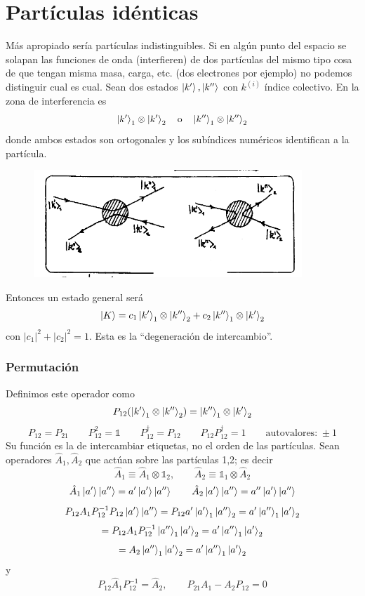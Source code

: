 \documentclass[10pt,oneside]{CBFT_book}
\begin{document}
\chapter{Partículas idénticas}

Más apropiado sería partículas indistinguibles. Si en algún punto del espacio se solapan las funciones de 
onda (interfieren) de dos partículas del mismo tipo cosa de que tengan misma masa, carga, etc. (dos 
electrones por ejemplo) no podemos distinguir cual es cual. Sean dos estados $\Ket{k'},\Ket{k''}$ con $k^{(i)}$ 
índice colectivo. En la zona de interferencia es 
\[
	\Ket{k'}_1 \otimes \Ket{k'}_2 \quad \text{o} \quad \Ket{k''}_1 \otimes \Ket{k''}_2
\]
donde ambos estados son ortogonales y los subíndices numéricos identifican a la partícula. 

\begin{figure}[htb]
	\begin{center}
	\includegraphics[width=0.9\textwidth]{images/teo2_29.pdf}
	\end{center}
	\caption{}
\end{figure} 
Entonces un estado general será
\[
	\Ket{K} = c_1 \Ket{k'}_1 \otimes \Ket{k''}_2 + c_2 \Ket{k''}_1 \otimes \Ket{k'}_2
\]
con $|c_1|^2 +|c_2|^2= 1$. 
Esta es la ``degeneración de intercambio''.

\subsection{Permutación}

Definimos este operador como 
\[
	P_{12}( \Ket{k'}_1\otimes \Ket{k''}_2 ) = \Ket{k''}_1\otimes \Ket{k'}_2
\]
\[
	P_{12} = P_{21} \qquad P_{12}^2 = \mathbb{1} \qquad P_{12}^\dagger = P_{12} \qquad 
	P_{12}P_{12}^\dagger = 1 \qquad \text{autovalores:} \; \pm 1
\]
Su función es la de intercambiar etiquetas, no el orden de las partículas.
Sean operadores $\hat{A}_1,\hat{A}_2$ que actúan sobre las partículas 1,2; es decir 
\[
	\hat{A}_1 \equiv \hat{A}_1\otimes\mathbb{1}_2, \qquad 
	\hat{A}_2 \equiv \mathbb{1}_1\otimes\hat{A}_2
\]
\[
	\hat{A}_1 \Ket{a'} \Ket{a''} = a' \Ket{a'} \Ket{a''} \qquad 
	\hat{A}_2 \Ket{a'} \Ket{a''} = a'' \Ket{a'} \Ket{a''} 
\]
\[
	P_{12}A_1P_{12}^{-1}P_{12}\Ket{a'} \Ket{a''} = P_{12} a' \Ket{a'}_1 \Ket{a''}_2 =
	a' \Ket{a''}_1 \Ket{a'}_2
\]
\[
	= P_{12}A_1P_{12}^{-1} \Ket{a''}_1 \Ket{a'}_2 = a' \Ket{a''}_1 \Ket{a'}_2
\]
\[
	= A_2 \Ket{a''}_1 \Ket{a'}_2 = a' \Ket{a''}_1 \Ket{a'}_2
\]
y
\[
	P_{12}\hat{A}_1P_{12}^{-1} = \hat{A}_2, \qquad P_{21} A_1 - A_2 P_{12} = 0
\]
\end{document}

